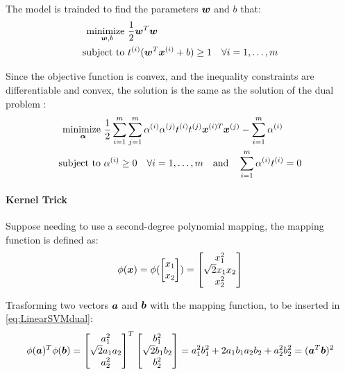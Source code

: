 The model is trainded to find the parameters $\bm{w}$ and $b$ that:
\begin{align}
    \label{eq:LinearSVM}
    \underset{\bm{w},b}{\text{minimize }} & \frac{1}{2}\bm{w}^T\bm{w} \\
    \text{subject to } & t^{(i)}(\bm{w}^T\bm{x}^{(i)} + b) \geq 1 \quad \forall i = 1, \dots, m
\end{align}

Since the objective function is convex, and the inequality constraints are differentiable and convex, the solution is the same as the solution of the dual problem :
\begin{align}
    \label{eq:LinearSVMdual}
    \underset{\bm{\alpha}}{\text{minimize }} & \frac{1}{2}\sum_{i=1}^{m}\sum_{j=1}^{m}\alpha^{(i)}\alpha^{(j)}t^{(i)}t^{(j)}\bm{x}^{(i)T}\bm{x}^{(j)} -\sum_{i=1}^{m}\alpha^{(i)}\\
    \text{subject to } & \alpha^{(i)} \geq 0 \quad \forall i = 1, \dots, m \quad \text{and} \quad \sum_{i=1}^{m}\alpha^{(i)}t^{(i)}=0
\end{align}

\paragraph{Kernel Trick}
Suppose needing to use a second-degree polynomial mapping, the mapping function is defined as:
\begin{equation}
    \phi(\bm{x}) = \phi(\begin{bmatrix}
        x_1 \\
        x_2 \\
    \end{bmatrix}) = \begin{bmatrix}
        x_1^2 \\
        \sqrt{2}x_1x_2 \\
        x_2^2 \\
    \end{bmatrix}
\end{equation}

Trasforming two vectors $\bm{a}$ and $\bm{b}$ with the mapping function, to be inserted in \autoref{eq:LinearSVMdual}:
\begin{equation}
    \phi(\bm{a})^T\phi(\bm{b}) = \begin{bmatrix}
        a_1^2 \\
        \sqrt{2}a_1a_2 \\
        a_2^2 \\
    \end{bmatrix}^T
    \begin{bmatrix}
        b_1^2 \\
        \sqrt{2}b_1b_2 \\
        b_2^2 \\
    \end{bmatrix} = a_1^2b_1^2 + 2a_1b_1a_2b_2 + a_2^2b_2^2 = (\bm{a}^T\bm{b})^2
\end{equation}

